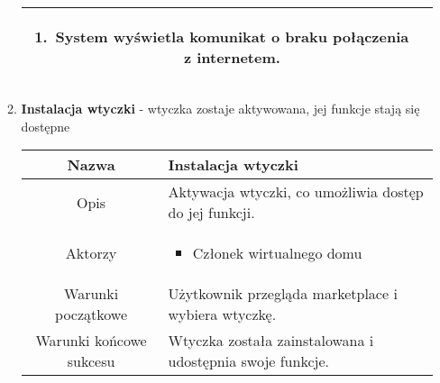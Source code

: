 \documentclass{article}
\begin{document}
\begin{enumerate}
\begin{enumerate}
\begin{table}[H]
\begin{tabular}{|c|p{7cm}|}
\begin{enumerate}
\item System wyświetla komunikat o braku połączenia z internetem.\end{enumerate}            \\
						\hline
					\end{tabular}
				\end{table}

			\item \textbf{Instalacja wtyczki} - wtyczka zostaje aktywowana, jej funkcje
				stają się dostępne
				\begin{table}[H]
					\centering
					\begin{tabular}{|c|p{7cm}|}
						\hline
						Nazwa                   & \textbf{Instalacja wtyczki}                                                                                                                                                                                                                                                                                                                   \\
						\hline
						Opis                    & Aktywacja wtyczki, co umożliwia dostęp do jej funkcji.                                                                                                                                                                                                                                                                                        \\
						\hline
						Aktorzy                 & \begin{itemize}\item Członek wirtualnego domu\end{itemize}                                                                                                                                                                                                                                                                                    \\
						\hline
						Warunki początkowe      & Użytkownik przegląda marketplace i wybiera wtyczkę.                                                                                                                                                                                                                                                                                           \\
						\hline
						Warunki końcowe sukcesu & Wtyczka została zainstalowana i udostępnia swoje funkcje.                                                                                                                                                                                                                                                                                     \\

\end{tabular}
\end{table}
\end{enumerate}
\end{enumerate}
\end{document}
